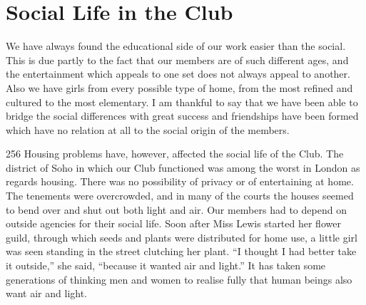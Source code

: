 \chapter{Social Life in the Club}

We have always found the educational side of our work
easier than the social. This is due partly to the fact that
our members are of such different ages, and the entertainment
which appeals to one set does not always appeal
to another. Also we have girls from every possible type
of home, from the most refined and cultured to the most
elementary. I am thankful to say that we have been able
to bridge the social differences with great success and
friendships have been formed which have no relation at
all to the social origin of the members.

\begin{tp}{256}
Housing problems have, however, affected the social
life of the Club. The district of Soho in which our Club
functioned was among the worst in London as regards
housing. There was no possibility of privacy or of
entertaining at home. The tenements were overcrowded,
and in many of the courts the houses seemed to bend
over and shut out both light and air. Our members had
to depend on outside agencies for their social life. Soon
after Miss Lewis started her flower guild, through which
seeds and plants were distributed for home use, a little
girl was seen standing in the street clutching her plant.
“I thought I had better take it outside,” she said, “because
it wanted air and light.” It has taken some generations
of thinking men and women to realise fully that
human beings also want air and light.
\end{tp}

